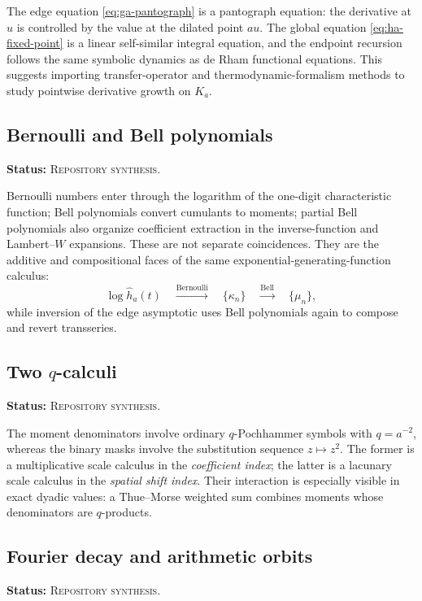 \documentclass[11pt]{article}
\theoremstyle{definition}
\theoremstyle{remark}
\newcommand{\RepoStatus}{\textcolor{RepoOlive}{\textsc{Repository synthesis}}}
\newcommand{\status}[1]{\par\smallskip\noindent\textbf{Status:} #1.\par\smallskip}
\begin{document}
The edge equation \eqref{eq:ga-pantograph} is a pantograph equation: the derivative at \(u\) is controlled by the value at the dilated point \(au\).  The global equation \eqref{eq:ha-fixed-point} is a linear self-similar integral equation, and the endpoint recursion follows the same symbolic dynamics as de Rham functional equations.  This suggests importing transfer-operator and thermodynamic-formalism methods to study pointwise derivative growth on \(K_a\).

\subsection{Bernoulli and Bell polynomials}
\status{\RepoStatus}

Bernoulli numbers enter through the logarithm of the one-digit characteristic function; Bell polynomials convert cumulants to moments; partial Bell polynomials also organize coefficient extraction in the inverse-function and Lambert--\(W\) expansions.  These are not separate coincidences.  They are the additive and compositional faces of the same exponential-generating-function calculus:
\begin{equation}
  \log\widehat h_a(t)
  \quad\xrightarrow{\text{Bernoulli}}\quad
  \{\kappa_n\}
  \quad\xrightarrow{\text{Bell}}\quad
  \{\mu_n\},
  \label{eq:bern-bell-pipeline}
\end{equation}
while inversion of the edge asymptotic uses Bell polynomials again to compose and revert transseries.

\subsection{Two \texorpdfstring{\(q\)}{q}-calculi}
\status{\RepoStatus}

The moment denominators involve ordinary \(q\)-Pochhammer symbols with \(q=a^{-2}\), whereas the binary masks involve the substitution sequence \(z\mapsto z^2\).  The former is a multiplicative scale calculus in the \emph{coefficient index}; the latter is a lacunary scale calculus in the \emph{spatial shift index}.  Their interaction is especially visible in exact dyadic values: a Thue--Morse weighted sum combines moments whose denominators are \(q\)-products.

\subsection{Fourier decay and arithmetic orbits}
\status{\RepoStatus}
\end{document}
